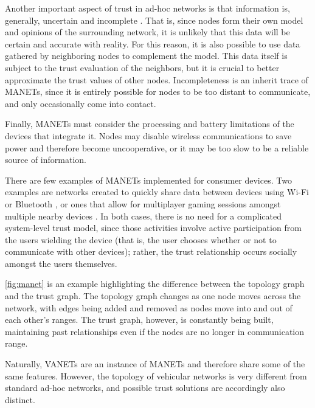 Another important aspect of trust in ad-hoc networks is that information is, generally, uncertain and incomplete \citep{baras2005cooperation}.
That is, since nodes form their own model and opinions of the surrounding network, it is unlikely that this data will be certain and accurate with reality.
For this reason, it is also possible to use data gathered by neighboring nodes to complement the model.
This data itself is subject to the trust evaluation of the neighbors, but it is crucial to better approximate the trust values of other nodes.
Incompleteness is an inherit trace of MANETs, since it is entirely possible for nodes to be too distant to communicate, and only occasionally come into contact.

Finally, MANETs must consider the processing and battery limitations of the devices that integrate it.
Nodes may disable wireless communications to save power and therefore become uncooperative, or it may be too slow to be a reliable source of information.

There are few examples of MANETs implemented for consumer devices.
Two examples are networks created to quickly share data between devices using Wi-Fi or Bluetooth \citep{krochmal2014discovery}, or ones that allow for multiplayer gaming sessions amongst multiple nearby devices \citep{sasaki2011wireless}.
In both cases, there is no need for a complicated system-level trust model, since those activities involve active participation from the users wielding the device (that is, the user chooses whether or not to communicate with other devices); rather, the trust relationship occurs socially amongst the users themselves.

\autoref{fig:manet} is an example highlighting the difference between the topology graph and the trust graph.
The topology graph changes as one node moves across the network, with edges being added and removed as nodes move into and out of each other's ranges.
The trust graph, however, is constantly being built, maintaining past relationships even if the nodes are no longer in communication range.

Naturally, VANETs are an instance of MANETs and therefore share some of the same features.
However, the topology of vehicular networks is very different from standard ad-hoc networks, and possible trust solutions are accordingly also distinct.

